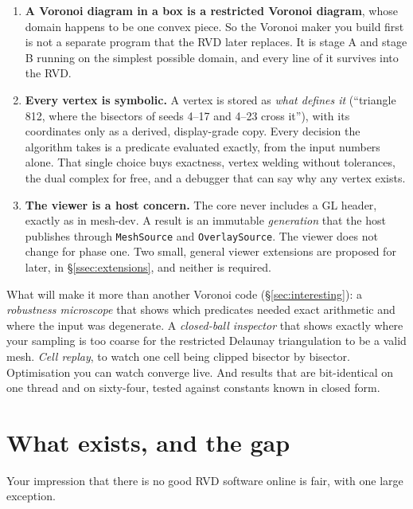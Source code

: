 \documentclass[11pt,a4paper]{article}
\newcommand{\code}[1]{\texttt{#1}}          %
\newcommand{\secref}[1]{\S\ref{#1}}
\begin{document}
\begin{enumerate}
\item \textbf{A Voronoi diagram in a box is a restricted Voronoi diagram}, whose domain happens
  to be one convex piece. So the Voronoi maker you build first is not a separate program that
  the RVD later replaces. It is stage A and stage B running on the simplest possible domain, and
  every line of it survives into the RVD.
\item \textbf{Every vertex is symbolic.} A vertex is stored as \emph{what defines it}
  (``triangle 812, where the bisectors of seeds 4--17 and 4--23 cross it''), with its
  coordinates only as a derived, display-grade copy. Every decision the algorithm takes is a
  predicate evaluated exactly, from the input numbers alone. That single choice buys exactness,
  vertex welding without tolerances, the dual complex for free, and a debugger that can say why
  any vertex exists.
\item \textbf{The viewer is a host concern.} The core never includes a GL header, exactly as in
  mesh-dev. A result is an immutable \emph{generation} that the host publishes through
  \code{MeshSource} and \code{OverlaySource}. The viewer does not change for phase one. Two
  small, general viewer extensions are proposed for later, in \secref{ssec:extensions}, and
  neither is required.
\end{enumerate}

What will make it more than another Voronoi code (\secref{sec:interesting}): a
\emph{robustness microscope} that shows which predicates needed exact arithmetic and where the
input was degenerate. A \emph{closed-ball inspector} that shows exactly where your sampling is
too coarse for the restricted Delaunay triangulation to be a valid mesh. \emph{Cell replay}, to
watch one cell being clipped bisector by bisector. Optimisation you can watch converge live. And
results that are bit-identical on one thread and on sixty-four, tested against constants known
in closed form.

\section{What exists, and the gap}\label{sec:exists}

Your impression that there is no good RVD software online is fair, with one large exception.
\end{document}
